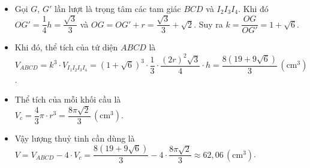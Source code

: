 \begin{ex}
{\begin{itemize}
			\item Gọi $G$, $G'$ lần lượt là trọng tâm các tam giác $BCD$ và $I_2I_3I_4$. Khi đó\\
			$OG'=\dfrac{1}{4}h=\dfrac{\sqrt{3}}{3}$ và $OG=OG'+r=\dfrac{\sqrt{3}}{3}+\sqrt{2}$. Suy ra $k=\dfrac{OG}{OG'}=1+\sqrt{6}$.
			\item Khi đó, thể tích của tứ diện $ABCD$ là\\
			$V_{ABCD}=k^3\cdot{V_{I_1I_2I_3I_4}}=(1+\sqrt{6})^3\cdot \dfrac{1}{3}\cdot \dfrac{(2r)^2\sqrt{3}}{4}\cdot h=\dfrac{8(19+9\sqrt{6})}{3}\,(\mathrm{cm^3})$.
			\item Thể tích của mỗi khối cầu là\\
			$V_c=\dfrac{4}{3}\pi\cdot r^3=\dfrac{8\pi \sqrt{2}}{3}\,(\mathrm{cm^3})$.
			\item Vậy lượng thuỷ tinh cần dùng là\\
			$V=V_{ABCD}-4\cdot{V_c}=\dfrac{8(19+9\sqrt{6})}{3}-4\cdot \dfrac{8\pi \sqrt{2}}{3}\approx 62{,}06\,(\mathrm{cm^3})$.
		\end{itemize}
	}
\end{ex}
